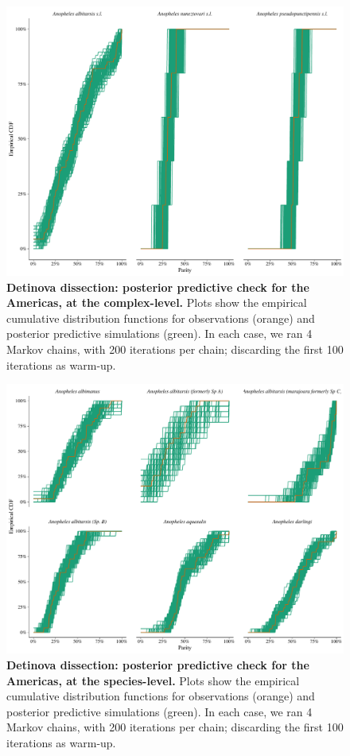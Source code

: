 \documentclass[12pt]{article}
\begin{document}
{\begin{figure}[ht]
	\centerline{\includegraphics[width=1\textwidth]{./Figure_files/detinova_ecdf_americas_grouped.pdf}}
	\caption{\textbf{Detinova dissection: posterior predictive check for the Americas, at the complex-level.} Plots show the empirical cumulative distribution functions for observations (orange) and posterior predictive simulations (green). In each case, we ran 4 Markov chains, with 200 iterations per chain; discarding the first 100 iterations as warm-up.}\label{fig:detinova_ecdf_americas_grouped}
\end{figure}

\begin{figure}[ht]
	\centerline{\includegraphics[width=1\textwidth]{./Figure_files/detinova_ecdf_americas_species.pdf}}
	\caption{\textbf{Detinova dissection: posterior predictive check for the Americas, at the species-level.} Plots show the empirical cumulative distribution functions for observations (orange) and posterior predictive simulations (green). In each case, we ran 4 Markov chains, with 200 iterations per chain; discarding the first 100 iterations as warm-up.}\label{fig:detinova_ecdf_americas_species}
\end{figure}

}
\end{document}

